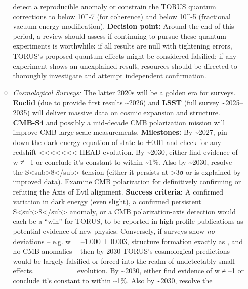 \documentclass[]{article}
\begin{document}
\begin{itemize}
\begin{itemize}
    detect a reproducible anomaly or constrain the TORUS quantum
    corrections to below 10\^{}-7 (for coherence) and below 10\^{}-5
    (fractional vacuum energy modification). \textbf{Decision point:}
    Around the end of this period, a review should assess if continuing
    to pursue these quantum experiments is worthwhile: if all results
    are null with tightening errors, TORUS's proposed quantum effects
    might be considered falsified; if any experiment shows an
    unexplained result, resources should be directed to thoroughly
    investigate and attempt independent confirmation.
  \item
    \emph{Cosmological Surveys:} The latter 2020s will be a golden era
    for surveys. \textbf{Euclid} (due to provide first results
    \textasciitilde{}2026) and \textbf{LSST} (full survey
    \textasciitilde{}2025--2035) will deliver massive data on cosmic
    expansion and structure. \textbf{CMB-S4} and possibly a mid-decade
    CMB polarization mission will improve CMB large-scale measurements.
    \textbf{Milestones:} By \textasciitilde{}2027, pin down the dark
    energy equation-of-state to ±0.01 and check for any redshift
<<<<<<< HEAD
    evolution. By \textasciitilde2030, either find evidence of w ≠ --1
    or conclude it's constant to within \textasciitilde1\%\hspace{0pt}.
    Also by \textasciitilde2030, resolve the
    S\textless sub\textgreater8\textless/sub\textgreater{} tension
    (either it persists at \textgreater3σ or is explained by improved
    data)\hspace{0pt}. Examine CMB polarization for definitively
    confirming or refuting the Axis of Evil alignment\hspace{0pt}.
    \textbf{Success criteria:} A confirmed variation in dark energy
    (even slight), a confirmed persistent
    S\textless sub\textgreater8\textless/sub\textgreater{} anomaly, or a
    CMB polarization-axis detection would each be a ``win'' for TORUS,
    to be reported in high-profile publications as potential evidence of
    new physics. Conversely, if surveys show \emph{no} deviations --
    e.g. w = --1.000 ± 0.003, structure formation exactly as \LambdaCDM, and
    no CMB anomalies -- then by 2030 TORUS's cosmological predictions
    would be largely falsified or forced into the realm of undetectably
    small effects.
=======
    evolution. By \textasciitilde{}2030, either find evidence of w ≠ --1
    or conclude it's constant to within \textasciitilde{}1\%​. Also by
    \textasciitilde{}2030, resolve the

\end{itemize}
\end{itemize}
\end{document}
